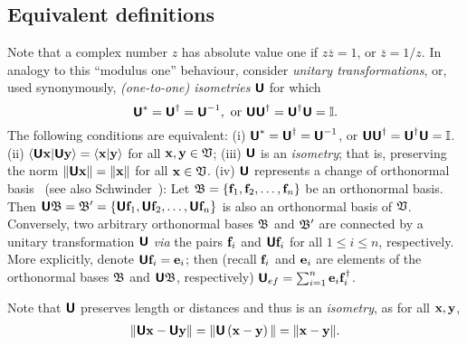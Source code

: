 \subsection {Equivalent definitions}
Note that a complex number $z$ has absolute value one if $z\overline{z}=1$, or $\overline{z}=1/z$.
In analogy to this ``modulus one'' behaviour,
consider {\em unitary transformations}, or, used synonymously, {\em (one-to-one) isometries}
$\textsf{\textbf{U}}$ for which
\begin{equation}
\textsf{\textbf{U}}^\ast = \textsf{\textbf{U}}^\dagger =\textsf{\textbf{U}}^{-1},
\textrm{ or } \textsf{\textbf{U}}\textsf{\textbf{U}}^\dagger =\textsf{\textbf{U}}^\dagger \textsf{\textbf{U}}={\Bbb I}.
\end{equation}
The following conditions are equivalent:
(i)
$\textsf{\textbf{U}}^\ast = \textsf{\textbf{U}}^\dagger =\textsf{\textbf{U}}^{-1}$,
or $\textsf{\textbf{U}}\textsf{\textbf{U}}^\dagger =\textsf{\textbf{U}}^\dagger \textsf{\textbf{U}}={\Bbb I}$.
(ii)
$\langle \textsf{\textbf{U}}{\bf x}\vert \textsf{\textbf{U}}{\bf y} \rangle
=
\langle {\bf x}\vert {\bf y} \rangle$ for all ${\bf x} ,{\bf y} \in {\frak V}$;
(iii)
$\textsf{\textbf{U}}$ is an {\em isometry};
that is, preserving the norm
$\| \textsf{\textbf{U}}{\bf x}\|
=
\|{\bf x}\|$ for all ${\bf x}  \in {\frak V}$.
(iv)
$\textsf{\textbf{U}}$ represents a change of orthonormal basis~\cite[\S~74]{halmos-vs}
(see also Schwinder~\cite{Schwinger.60}):
Let ${\frak B}=\{{\bf f}_1,  {\bf f}_2, \ldots , {\bf f}_n\}$
be an orthonormal basis.
Then
$\textsf{\textbf{U}}{\frak B}={\frak B}'=\{\textsf{\textbf{U}}{\bf f}_1, \textsf{\textbf{U}} {\bf f}_2,
\ldots ,\textsf{\textbf{U}} {\bf f}_n\}$
is also an orthonormal basis of  ${\frak V}$.
Conversely, two arbitrary orthonormal bases
${\frak B}$
and
${\frak B}'$
are connected by a unitary transformation $\textsf{\textbf{U}}$ {\it via} the pairs  ${\bf f}_i$ and $ \textsf{\textbf{U}}{\bf f}_i$
for all $1\le i \le n$, respectively.
More explicitly, denote  $\textsf{\textbf{U}} {\bf f}_i   = {\bf e}_i$; then
(recall ${\bf f}_i$ and ${\bf e}_i$ are elements of the orthonormal bases
$  {\frak B} $  and $ \textsf{\textbf{U}} {\frak B} $, respectively)
$\textsf{\textbf{U}}_{ef}   = \sum_{i=1}^n{\bf e}_i  {\bf f}_i^\dagger$.



Note that $\textsf{\textbf{U}}$ preserves length or distances and thus is an {\em isometry}, as for all ${\bf x}, {\bf y}$,
\begin{equation}
\begin{split}
\| \textsf{\textbf{U}}{\bf x} - \textsf{\textbf{U}}{\bf y} \| =
\| \textsf{\textbf{U}}\left( {\bf x} - {\bf y} \right) \| =
\|{\bf x}- {\bf y}\|
.
\end{split}
\label{2016-m-ch-uniteqpl}
\end{equation}

